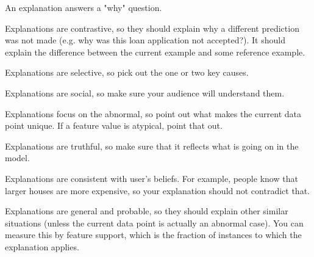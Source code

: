 \documentclass[a4paper]{article}
\begin{document}
An explanation answers a "why" question.

Explanations are contrastive, so they should explain why a different prediction
was not made (e.g. why was this loan application not accepted?). It should
explain the difference between the current example and some reference example.

Explanations are selective, so pick out the one or two key causes.

Explanations are social, so make sure your audience will understand them.

Explanations focus on the abnormal, so point out what makes the current data
point unique. If a feature value is atypical, point that out.

Explanations are truthful, so make sure that it reflects what is going on in
the model.

Explanations are consistent with user's beliefs. For example, people know that
larger houses are more expensive, so your explanation should not contradict
that.

Explanations are general and probable, so they should explain other similar
situations (unless the current data point is actually an abnormal case). You
can measure this by feature support, which is the fraction of instances to which
the explanation applies.
\end{document}
